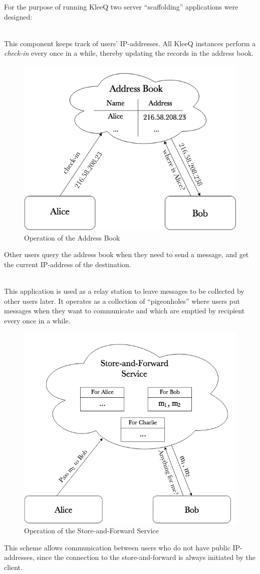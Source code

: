 \documentclass[a4paper, 12pt]{report}
\begin{document}
For the purpose of running KleeQ two server ``scaffolding'' applications were designed:
\begin{description}[labelindent=0.5cm, leftmargin=1.3cm, rightmargin=0.5cm]
    \item[Address Book]\hfill \\
        This component keeps track of users' IP-addresses. All KleeQ instances perform a \emph{check-in} every once in a while, thereby updating the records in the address book. 
        \begin{figure}[H]
            \centering
            \includegraphics[width = 0.6 \linewidth]{pics/addressBook.png}
            \caption{\label{fig:addressBook}Operation of the Address Book}
        \end{figure}
        Other users query the address book when they need to send a message, and get the current IP-address of the destination.

    \item[Store-and-Forward Service] \hfill \\
        This application is used as a relay station to leave messages to be collected by other users later. It operates as a collection of ``pigeonholes'' where users put messages when they want to communicate and which are emptied by recipient every once in a while. 
        \begin{figure}[H]
            \centering
            \includegraphics[width = 0.6 \linewidth]{pics/saf.png}
            \caption{\label{fig:addressBook}Operation of the Store-and-Forward Service}
        \end{figure}
        This scheme allows communication between users who do not have public IP-addresses, since the connection to the store-and-forward is always initiated by the client.
\end{description}
\end{document}
